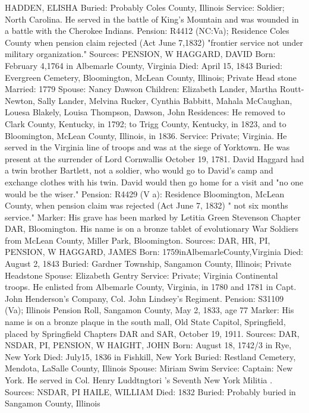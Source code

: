 HADDEN, ELISHA 
Buried: Probably Coles County, Illinois 
Service: Soldier; North Carolina. He served in the battle of King's Mountain and was wounded in a battle with the Cherokee Indians. 
Pension: R4412 (NC:Va); Residence Coles County when pension claim rejected (Act June 7,1832) "frontier service not under military organization." 
Sources: PENSION, W 
HAGGARD, DAVID
Born: February 4,1764 in Albemarle County, Virginia 
Died: April 15, 1843 
Buried: Evergreen Cemetery, Bloomington, McLean County, Illinois; Private Head stone Married: 1779 
Spouse: Nancy Dawson 
Children: Elizabeth Lander, Martha Routt-Newton, Sally Lander, Melvina Rucker, Cynthia Babbitt, Mahala McCaughan, Louesa Blakely, Louisa Thompson, Dawson, John 
Residences: He removed to Clark County, Kentucky, in 1792; to Trigg County, Kentucky, in 1823, and to Bloomington, McLean County, Illinois, in 1836. 
Service: Private; Virginia. He served in the Virginia line of troops and was at the siege of Yorktown. He was present at the surrender of Lord Cornwallis October 19, 1781. David Haggard had a twin brother Bartlett, not a soldier, who would go to David's camp and exchange clothes with his twin. David would then go home for a visit and "no one would be the wiser." 
Pension: R4429 (V a): Residence Bloomington, McLean County, when pension claim was rejected (Act June 7, 1832) " not six months service." 
Marker: His grave has been marked by Letitia Green Stevenson Chapter DAR, Bloomington. His name is on a bronze tablet of evolutionary War Soldiers from McLean County, Miller Park, Bloomington. 
Sources: DAR, HR, PI, PENSION, W 
HAGGARD, JAMES 
Born: 1759inAlbemarleCounty,Virginia 
Died: August 2, 1843 
Buried: Gardner Township, Sangamon County, Illinois; Private Headstone 
Spouse: Elizabeth Gentry 
Service: Private; Virginia Continental troops.  He enlisted from Albemarle County, Virginia, in 1780 and 1781 in Capt. John Henderson's Company, Col. John Lindsey's Regiment. 
Pension: S31109 (Va); Illinois Pension Roll, Sangamon County, May 2, 1833, age 77 
Marker: His name is on a bronze plaque in the south mall, Old State Capitol, Springfield, placed by Springfield Chapters DAR and SAR, October 19, 1911. Sources: DAR, NSDAR, PI, PENSION, W 
HAIGHT, JOHN 
Born: August 18, 1742/3 in Rye, New York
Died: July15, 1836 in Fishkill, New York 
Buried: Restland Cemetery, Mendota, LaSalle County, Illinois 
Spouse: Miriam Swim 
Service: Captain: New York. He served in Col. Henry Luddtngtori 's Seventh New York Militia . 
Sources: NSDAR, PI 
HAILE, WILLIAM 
Died: 1832 
Buried: Probably buried in Sangamon County, Illinois 
